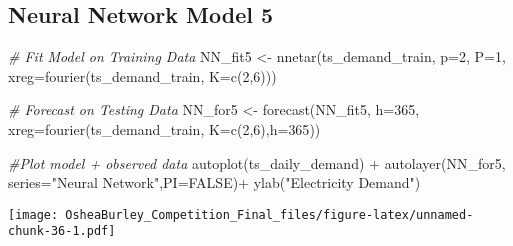 \documentclass[
]{article}
\newenvironment{Shaded}{\begin{snugshade}}{\end{snugshade}}
\newcommand{\AttributeTok}[1]{\textcolor[rgb]{0.77,0.63,0.00}{#1}}
\newcommand{\CommentTok}[1]{\textcolor[rgb]{0.56,0.35,0.01}{\textit{#1}}}
\newcommand{\ConstantTok}[1]{\textcolor[rgb]{0.00,0.00,0.00}{#1}}
\newcommand{\DecValTok}[1]{\textcolor[rgb]{0.00,0.00,0.81}{#1}}
\newcommand{\FunctionTok}[1]{\textcolor[rgb]{0.00,0.00,0.00}{#1}}
\newcommand{\NormalTok}[1]{#1}
\newcommand{\OtherTok}[1]{\textcolor[rgb]{0.56,0.35,0.01}{#1}}
\newcommand{\SpecialCharTok}[1]{\textcolor[rgb]{0.00,0.00,0.00}{#1}}
\newcommand{\StringTok}[1]{\textcolor[rgb]{0.31,0.60,0.02}{#1}}
\begin{document}
\begin{Shaded}
\end{Shaded}

\hypertarget{neural-network-model-5}{%
\subsection{Neural Network Model 5}\label{neural-network-model-5}}

\begin{Shaded}
\begin{Highlighting}[]
\CommentTok{\# Fit Model on Training Data}
\NormalTok{NN\_fit5 }\OtherTok{\textless{}{-}} \FunctionTok{nnetar}\NormalTok{(ts\_demand\_train,}
                 \AttributeTok{p=}\DecValTok{2}\NormalTok{,}
                 \AttributeTok{P=}\DecValTok{1}\NormalTok{,}
                 \AttributeTok{xreg=}\FunctionTok{fourier}\NormalTok{(ts\_demand\_train, }\AttributeTok{K=}\FunctionTok{c}\NormalTok{(}\DecValTok{2}\NormalTok{,}\DecValTok{6}\NormalTok{)))}

\CommentTok{\# Forecast on Testing Data}
\NormalTok{NN\_for5 }\OtherTok{\textless{}{-}} \FunctionTok{forecast}\NormalTok{(NN\_fit5, }
                   \AttributeTok{h=}\DecValTok{365}\NormalTok{,}
                   \AttributeTok{xreg=}\FunctionTok{fourier}\NormalTok{(ts\_demand\_train, }
                                          \AttributeTok{K=}\FunctionTok{c}\NormalTok{(}\DecValTok{2}\NormalTok{,}\DecValTok{6}\NormalTok{),}\AttributeTok{h=}\DecValTok{365}\NormalTok{))}

\CommentTok{\#Plot model + observed data}
\FunctionTok{autoplot}\NormalTok{(ts\_daily\_demand) }\SpecialCharTok{+}
  \FunctionTok{autolayer}\NormalTok{(NN\_for5, }\AttributeTok{series=}\StringTok{"Neural Network"}\NormalTok{,}\AttributeTok{PI=}\ConstantTok{FALSE}\NormalTok{)}\SpecialCharTok{+}
  \FunctionTok{ylab}\NormalTok{(}\StringTok{"Electricity Demand"}\NormalTok{) }
\end{Highlighting}
\end{Shaded}

\texttt{[image: OsheaBurley\_Competition\_Final\_files/figure-latex/unnamed-chunk-36-1.pdf]}
\end{document}

